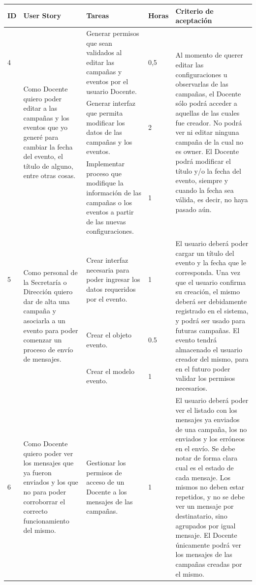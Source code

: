 \documentclass[a4paper, 11pt]{article}
\begin{document}
\begin{table}[H]
\centering
\begin{tabular}{ | p{0.5cm} | p{4cm} | p{5cm} | p{0.85cm} | p{5cm} |}
\hline 
ID & User Story & Tareas & Horas & Criterio de aceptación \\ \hline \hline


4 & \multirow{3}{4cm}{Como Docente quiero poder editar a las campañas y los eventos que yo generé para cambiar la fecha del evento, el título de alguno, entre otras cosas.} & Generar permisos que sean validados al editar las campañas y eventos por el usuario Docente. & 0,5 & \multirow{3}{4cm}{Al momento de querer editar las configuraciones u observarlas de las campañas, el Docente sólo podrá acceder a aquellas de las cuales fue creador. No podrá ver ni editar ninguna campaña de la cual no es owner. El Docente podrá modificar el título y/o la fecha del evento, siempre y cuando la fecha sea válida, es decir, no haya pasado aún.} \\[2.5cm] \cline{3-4}
& & Generar interfaz que permita modificar los datos de las campañas y los eventos. & 2 & \\[2.5cm] \cline{3-4}
& & Implementar proceso que modifique la información de las campañas o los eventos a partir de las nuevas configuraciones. & 1 & \\[2.5cm] \hline


5 & \multirow{3}{4cm}{Como personal de la Secretaría o Dirección quiero dar de alta una campaña y asociarla a un evento para poder comenzar un proceso de envío de mensajes.} & Crear interfaz necesaria para poder ingresar los datos requeridos por el evento. & 1 & \multirow{3}{4cm}{El usuario deberá poder cargar un título del evento y la fecha que le corresponda. Una vez que el usuario confirma su creación, el mismo deberá ser debidamente registrado en el sistema, y podrá ser usado para futuras campañas. El evento tendrá almacenado el usuario creador del mismo, para en el futuro poder validar los permisos necesarios.} \\[2.5cm] \cline{3-4}
& & Crear el objeto evento. & 0.5 & \\[2.5cm] \cline{3-4}
& & Crear el modelo evento. & 1 & \\[2.5cm] \hline


6 & Como Docente quiero poder ver los mensajes que ya fueron enviados y los que no para poder corroborrar el correcto funcionamiento del mismo. & Gestionar los permisos de acceso de un Docente a los mensajes de las campañas. & 1 & El usuario deberá poder ver el listado con los mensajes ya enviados de una campaña, los no enviados y los erróneos en el envío. Se debe notar de forma clara cual es el estado de cada mensaje. Los mismos no deben estar repetidos, y no se debe ver un mensaje por destinatario, sino agrupados por igual mensaje. El Docente únicamente podrá ver los mensajes de las campañas creadas por el mismo. \\ \hline


\end{tabular}
\end{table}
\end{document}
